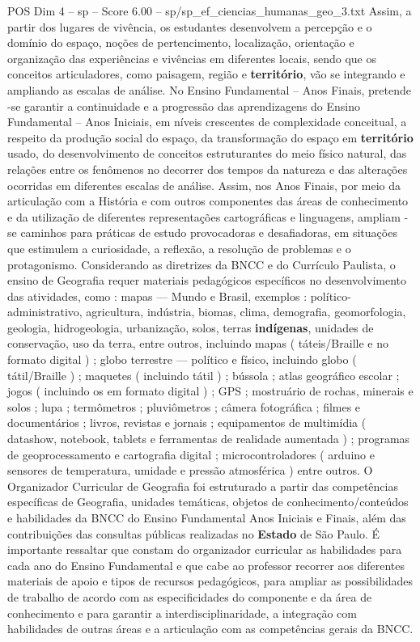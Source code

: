 \begin{textsample}{POS Dim 4 – sp – Score 6.00 – sp/sp\_ef\_ciencias\_humanas\_geo\_3.txt}
Assim, a partir dos lugares de vivência, os estudantes desenvolvem a percepção e o domínio do espaço, noções de pertencimento, localização, orientação e organização das experiências e vivências em diferentes locais, sendo que os conceitos articuladores, como paisagem, região e \textbf{território}, vão se integrando e ampliando as escalas de análise.
No Ensino Fundamental – Anos Finais, pretende -se garantir a continuidade e a progressão das aprendizagens do Ensino Fundamental – Anos Iniciais, em níveis crescentes de complexidade conceitual, a respeito da produção social do espaço, da transformação do espaço em \textbf{território} usado, do desenvolvimento de conceitos estruturantes do meio físico natural, das relações entre os fenômenos no decorrer dos tempos da natureza e das alterações ocorridas em diferentes escalas de análise.
Assim, nos Anos Finais, por meio da articulação com a História e com outros componentes das áreas de conhecimento e da utilização de diferentes representações cartográficas e linguagens, ampliam -se caminhos para práticas de estudo provocadoras e desafiadoras, em situações que estimulem a curiosidade, a reflexão, a resolução de problemas e o protagonismo.
Considerando as diretrizes da BNCC e do Currículo Paulista, o ensino de Geografia requer materiais pedagógicos específicos no desenvolvimento das atividades, como : mapas — Mundo e Brasil, exemplos : político-administrativo, agricultura, indústria, biomas, clima, demografia, geomorfologia, geologia, hidrogeologia, urbanização, solos, terras \textbf{indígenas}, unidades de conservação, uso da terra, entre outros, incluindo mapas ( táteis/Braille e no formato digital ) ; globo terrestre — político e físico, incluindo globo ( tátil/Braille ) ; maquetes ( incluindo tátil ) ; bússola ; atlas geográfico escolar ; jogos ( incluindo os em formato digital ) ; GPS ; mostruário de rochas, minerais e solos ; lupa ; termômetros ; pluviômetros ; câmera fotográfica ; filmes e documentários ; livros, revistas e jornais ; equipamentos de multimídia ( datashow, notebook, tablets e ferramentas de realidade aumentada ) ; programas de geoprocessamento e cartografia digital ; microcontroladores ( arduino e sensores de temperatura, umidade e pressão atmosférica ) entre outros.
O Organizador Curricular de Geografia foi estruturado a partir das competências específicas de Geografia, unidades temáticas, objetos de conhecimento/conteúdos e habilidades da BNCC do Ensino Fundamental Anos Iniciais e Finais, além das contribuições das consultas públicas realizadas no \textbf{Estado} de São Paulo.
É importante ressaltar que constam do organizador curricular as habilidades para cada ano do Ensino Fundamental e que cabe ao professor recorrer aos diferentes materiais de apoio e tipos de recursos pedagógicos, para ampliar as possibilidades de trabalho de acordo com as especificidades do componente e da área de conhecimento e para garantir a interdisciplinaridade, a integração com habilidades de outras áreas e a articulação com as competências gerais da BNCC.

\end{textsample}
